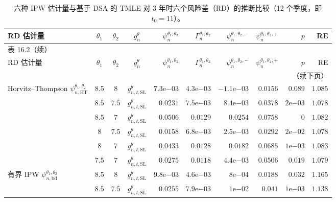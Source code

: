 \begingroup
\scriptsize\setlength{\tabcolsep}{2.6pt}\renewcommand{\arraystretch}{1.08}
\begin{longtable}{@{}p{2.55cm}cccrrrrrr@{}}
\caption{六种 IPW 估计量与基于 DSA 的 TMLE 对 3 年时六个风险差（RD）的推断比较（12 个季度，即 $t_0=11$）。}\label{tab:ch16-two}\\
\toprule
RD 估计量 & $\theta_1$ & $\theta_2$ & $g_n^\theta$ & $\psi_n^{\theta_1,\theta_2}$ & $\Gamma_n^{\theta_1,\theta_2}$ & $\psi_n^{\theta_1,\theta_2,-}$ & $\psi_n^{\theta_1,\theta_2,+}$ & $p$ & RE\\
\midrule
\endfirsthead
\multicolumn{10}{l}{\small 表 16.2（续）}\\
\toprule
RD 估计量 & $\theta_1$ & $\theta_2$ & $g_n^\theta$ & $\psi_n^{\theta_1,\theta_2}$ & $\Gamma_n^{\theta_1,\theta_2}$ & $\psi_n^{\theta_1,\theta_2,-}$ & $\psi_n^{\theta_1,\theta_2,+}$ & $p$ & RE\\
\midrule
\endhead
\midrule\multicolumn{10}{r}{（续下页）}\\
\endfoot
\bottomrule
\endlastfoot
\shortstack[l]{Horvitz--Thompson\\$\psi^{\theta_1,\theta_2}_{n,\mathrm{HT}}$} & $8.5$ & $8$ & $g^\theta_{n,t,\mathrm{SL}}$ & $7.3\mathrm e{-03}$ & $4.3\mathrm e{-03}$ & $-1.1\mathrm e{-03}$ & $0.0156$ & $0.089$ & $1.085$\\
 & $8.5$ & $7.5$ & $g^\theta_{n,t,\mathrm{SL}}$ & $0.0231$ & $7.5\mathrm e{-03}$ & $8.4\mathrm e{-03}$ & $0.0378$ & $2\mathrm e{-03}$ & $1.078$\\
 & $8.5$ & $7$ & $g^\theta_{n,t,\mathrm{SL}}$ & $0.0506$ & $0.0129$ & $0.0254$ & $0.0758$ & $0$ & $1.082$\\
 & $8$ & $7.5$ & $g^\theta_{n,t,\mathrm{SL}}$ & $0.0158$ & $6.8\mathrm e{-03}$ & $2.5\mathrm e{-03}$ & $0.0292$ & $2\mathrm e{-02}$ & $1.078$\\
 & $8$ & $7$ & $g^\theta_{n,t,\mathrm{SL}}$ & $0.0433$ & $0.0128$ & $0.0182$ & $0.0685$ & $1\mathrm e{-03}$ & $1.083$\\
 & $7.5$ & $7$ & $g^\theta_{n,t,\mathrm{SL}}$ & $0.0275$ & $0.0118$ & $4.4\mathrm e{-03}$ & $0.0506$ & $0.019$ & $1.079$\\
\midrule
\shortstack[l]{有界 IPW\\$\psi^{\theta_1,\theta_2}_{n,\mathrm{bd}}$} & $8.5$ & $8$ & $g^\theta_{n,t,\mathrm{SL}}$ & $9.8\mathrm e{-03}$ & $4.6\mathrm e{-03}$ & $8\mathrm e{-04}$ & $0.0188$ & $0.032$ & $1.165$\\
 & $8.5$ & $7.5$ & $g^\theta_{n,t,\mathrm{SL}}$ & $0.0255$ & $7.9\mathrm e{-03}$ & $1\mathrm e{-02}$ & $0.041$ & $1\mathrm e{-03}$ & $1.138$\\

\end{longtable}
